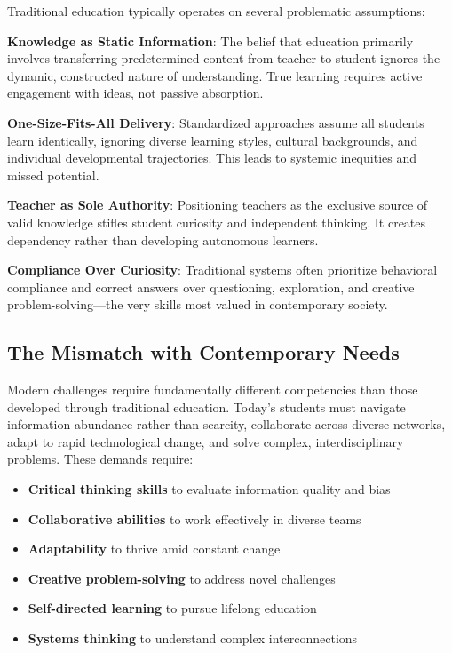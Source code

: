 \documentclass[
  Letterpaper,
]{scrbook}
\providecommand{\tightlist}{%
  \setlength{\itemsep}{0pt}\setlength{\parskip}{0pt}}\usepackage{longtable,booktabs,array}
\begin{document}
Traditional education typically operates on several problematic
assumptions:

\textbf{Knowledge as Static Information}: The belief that education
primarily involves transferring predetermined content from teacher to
student ignores the dynamic, constructed nature of understanding. True
learning requires active engagement with ideas, not passive absorption.

\textbf{One-Size-Fits-All Delivery}: Standardized approaches assume all
students learn identically, ignoring diverse learning styles, cultural
backgrounds, and individual developmental trajectories. This leads to
systemic inequities and missed potential.

\textbf{Teacher as Sole Authority}: Positioning teachers as the
exclusive source of valid knowledge stifles student curiosity and
independent thinking. It creates dependency rather than developing
autonomous learners.

\textbf{Compliance Over Curiosity}: Traditional systems often prioritize
behavioral compliance and correct answers over questioning, exploration,
and creative problem-solving---the very skills most valued in
contemporary society.

\subsection{The Mismatch with Contemporary
Needs}\label{the-mismatch-with-contemporary-needs}

Modern challenges require fundamentally different competencies than
those developed through traditional education. Today's students must
navigate information abundance rather than scarcity, collaborate across
diverse networks, adapt to rapid technological change, and solve
complex, interdisciplinary problems. These demands require:

\begin{itemize}
\tightlist
\item
  \textbf{Critical thinking skills} to evaluate information quality and
  bias
\item
  \textbf{Collaborative abilities} to work effectively in diverse teams
\item
  \textbf{Adaptability} to thrive amid constant change
\item
  \textbf{Creative problem-solving} to address novel challenges
\item
  \textbf{Self-directed learning} to pursue lifelong education
\item
  \textbf{Systems thinking} to understand complex interconnections
\end{itemize}
\end{document}

